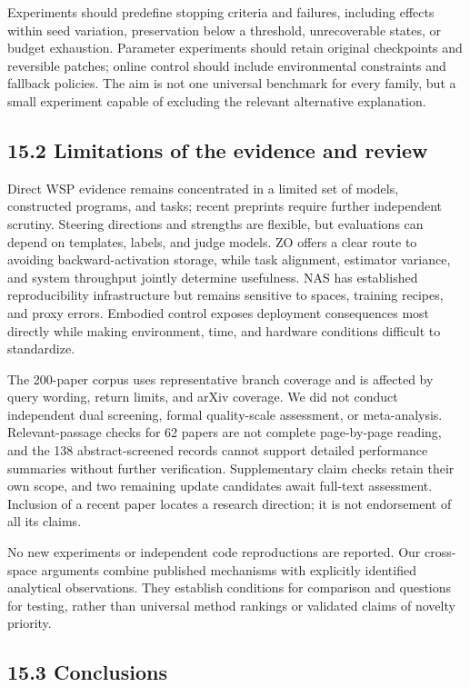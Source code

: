 Experiments should predefine stopping criteria and failures, including effects within seed variation, preservation below a threshold, unrecoverable states, or budget exhaustion. Parameter experiments should retain original checkpoints and reversible patches; online control should include environmental constraints and fallback policies. The aim is not one universal benchmark for every family, but a small experiment capable of excluding the relevant alternative explanation.


\subsection*{15.2 Limitations of the evidence and review}

Direct WSP evidence remains concentrated in a limited set of models, constructed programs, and tasks; recent preprints require further independent scrutiny. Steering directions and strengths are flexible, but evaluations can depend on templates, labels, and judge models. ZO offers a clear route to avoiding backward-activation storage, while task alignment, estimator variance, and system throughput jointly determine usefulness. NAS has established reproducibility infrastructure but remains sensitive to spaces, training recipes, and proxy errors. Embodied control exposes deployment consequences most directly while making environment, time, and hardware conditions difficult to standardize.\cite{r1,r49,r61,r87,r124,r146,r197}


The 200-paper corpus uses representative branch coverage and is affected by query wording, return limits, and arXiv coverage. We did not conduct independent dual screening, formal quality-scale assessment, or meta-analysis. Relevant-passage checks for 62 papers are not complete page-by-page reading, and the 138 abstract-screened records cannot support detailed performance summaries without further verification. Supplementary claim checks retain their own scope, and two remaining update candidates await full-text assessment. Inclusion of a recent paper locates a research direction; it is not endorsement of all its claims.


No new experiments or independent code reproductions are reported. Our cross-space arguments combine published mechanisms with explicitly identified analytical observations. They establish conditions for comparison and questions for testing, rather than universal method rankings or validated claims of novelty priority.


\subsection*{15.3 Conclusions}

